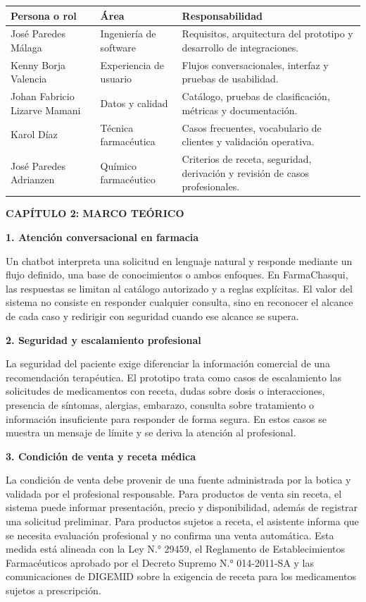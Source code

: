 \documentclass[11pt,a4paper]{article}
\newcommand{\capitulo}[1]{\vspace{1.2em}\noindent\textbf{\large #1}\par\vspace{0.45em}}
\newcommand{\apartado}[1]{\vspace{0.85em}\noindent\textbf{#1}\par\vspace{0.3em}}
\begin{document}
\begin{table}[h!]
\centering
\small
\begin{tabularx}{\textwidth}{p{}p{}Y}
\toprule
\textbf{Persona o rol} & \textbf{Área} & \textbf{Responsabilidad} \\
\midrule
José Paredes Málaga & Ingeniería de software & Requisitos, arquitectura del prototipo y desarrollo de integraciones. \\
Kenny Borja Valencia & Experiencia de usuario & Flujos conversacionales, interfaz y pruebas de usabilidad. \\
Johan Fabricio Lizarve Mamani & Datos y calidad & Catálogo, pruebas de clasificación, métricas y documentación. \\
Karol Díaz & Técnica farmacéutica & Casos frecuentes, vocabulario de clientes y validación operativa. \\
José Paredes Adrianzen & Químico farmacéutico & Criterios de receta, seguridad, derivación y revisión de casos profesionales. \\
\bottomrule
\end{tabularx}
\end{table}

\capitulo{CAPÍTULO 2: MARCO TEÓRICO}

\apartado{1. Atención conversacional en farmacia}

Un chatbot interpreta una solicitud en lenguaje natural y responde mediante un flujo definido, una base de conocimientos o ambos enfoques. En FarmaChasqui, las respuestas se limitan al catálogo autorizado y a reglas explícitas. El valor del sistema no consiste en responder cualquier consulta, sino en reconocer el alcance de cada caso y redirigir con seguridad cuando ese alcance se supera.

\apartado{2. Seguridad y escalamiento profesional}

La seguridad del paciente exige diferenciar la información comercial de una recomendación terapéutica. El prototipo trata como casos de escalamiento las solicitudes de medicamentos con receta, dudas sobre dosis o interacciones, presencia de síntomas, alergias, embarazo, consulta sobre tratamiento o información insuficiente para responder de forma segura. En estos casos se muestra un mensaje de límite y se deriva la atención al profesional.

\apartado{3. Condición de venta y receta médica}

La condición de venta debe provenir de una fuente administrada por la botica y validada por el profesional responsable. Para productos de venta sin receta, el sistema puede informar presentación, precio y disponibilidad, además de registrar una solicitud preliminar. Para productos sujetos a receta, el asistente informa que se necesita evaluación profesional y no confirma una venta automática. Esta medida está alineada con la Ley N.° 29459, el Reglamento de Establecimientos Farmacéuticos aprobado por el Decreto Supremo N.° 014-2011-SA y las comunicaciones de DIGEMID sobre la exigencia de receta para los medicamentos sujetos a prescripción.
\end{document}
